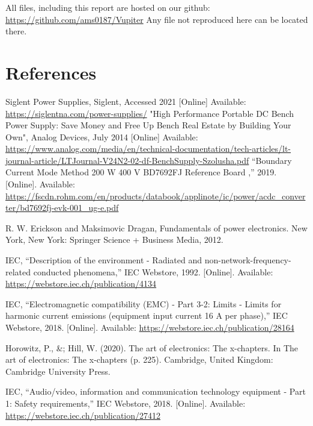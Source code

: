\documentclass[15pt]{article}
\begin{document}
All files, including this report are hosted on our github:
\url{https://github.com/ams0187/Vupiter} Any file not reproduced here can be located there.
\pagebreak
\raggedright
\section{References}
\begingroup
\renewcommand{\section}[2]{}
\begin{thebibliography}{}
    Siglent Power Supplies, Siglent, Accessed 2021 [Online] Available: \url{
        https://siglentna.com/power-supplies/}
    "High Performance Portable DC Bench Power Supply: Save Money and Free Up Bench Real Estate by Building Your Own", Analog Devices, July 2014 [Online] Available:
    \url{https://www.analog.com/media/en/technical-documentation/tech-articles/lt-journal-article/LTJournal-V24N2-02-df-BenchSupply-Szolusha.pdf}
    “Boundary Current Mode Method 200 W 400 V BD7692FJ Reference Board ,” 2019. [Online]. Available: \url{https://fscdn.rohm.com/en/products/databook/applinote/ic/power/acdc_converter/bd7692fj-evk-001_ug-e.pdf}

    R. W. Erickson and Maksimovic Dragan, Fundamentals of power electronics. New York, New York: Springer Science + Business Media, 2012.

    IEC, “Description of the environment - Radiated and non-network-frequency-related conducted phenomena,” IEC Webstore, 1992. [Online]. Available: 
    \url{https://webstore.iec.ch/publication/4134}

    IEC, “Electromagnetic compatibility (EMC) - Part 3-2: Limits - Limits for harmonic current emissions (equipment input current 16 A per phase),” IEC Webstore, 2018. [Online]. Available:
    \url{https://webstore.iec.ch/publication/28164}

    Horowitz, P., \&; Hill, W. (2020). The art of electronics: The x-chapters. In The art of electronics: The x-chapters (p. 225). Cambridge, United Kingdom: Cambridge University Press.

    IEC, “Audio/video, information and communication technology equipment - Part 1: Safety requirements,” IEC Webstore, 2018. [Online]. Available: 
    \url{https://webstore.iec.ch/publication/27412}


\end{thebibliography}
\end{document}
